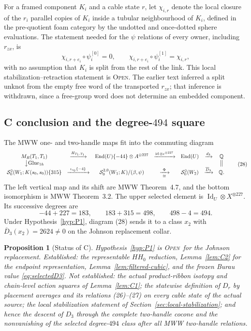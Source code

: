 \documentclass[11pt]{amsart}
\newtheorem{proposition}[theorem]{Proposition}
\theoremstyle{definition}
\theoremstyle{remark}
\newcommand{\Q}{\mathbb{Q}}
\newcommand{\Open}{\textnormal{\textsc{Open}}}
\begin{document}
For a framed component $K_i$ and a cable state $r$, let $\chi_{i,r}$ denote
the local closure of the $r_i$ parallel copies of $K_i$ inside a tubular
neighbourhood of $K_i$, defined in the pre-quotient foam category by the
undotted and once-dotted sphere evaluations.  The statement needed for the
$\psi$ relations of every owner, including $r_{zx}$, is
\[
\chi_{i,r+e_i}\circ\psi_i^{[0]}=0,\qquad
\chi_{i,r+e_i}\circ\psi_i^{[1]}=\chi_{i,r},
\]
with no assumption that $K_i$ is split from the rest of the link.  This
local stabilization--retraction statement is \Open.  The earlier text
inferred a split unknot from the empty free word of the transported
$r_{zx}$; that inference is withdrawn, since a free-group word does not
determine an embedded component.

\subsection{C conclusion and the degree-$494$ square}

The MWW one- and two-handle maps fit into the commuting diagram
\[
\begin{array}{ccccccc}
M_R(T_1,T_1)&\xrightarrow{H_{T_1,T_1}}&
\operatorname{End}(U)\{-44\}\otimes A^{\otimes227}
&\xrightarrow{\operatorname{id}\otimes\epsilon^{\otimes227}}&
\operatorname{End}(U)&\xrightarrow{d_3}&\Q\\
\big\downarrow{\mathrm{Glue}_{1h}}&&&&&&\big\Vert\\
\mathcal S^2_0(W_1;K(s_0,s_0))\{315\}
&\xrightarrow{\ \iota_{s_0}\{-4\}\ }&
\mathcal S^{2,0}_0(W_1;K)/(\beta,\psi)
&\xrightarrow[\cong]{\ \Phi\ }&\mathcal S^2_0(W_2)
&\xrightarrow{\overline D_3}&\Q.
\end{array}
\tag{28}
\]
The left vertical map and its shift are MWW Theorem~4.7, and the bottom
isomorphism is MWW Theorem~3.2.  The upper selected element is
$\operatorname{Id}_U\otimes X^{\otimes227}$.  Its successive degrees are
\[
-44+227=183,\qquad183+315=498,\qquad498-4=494.
\]
Under Hypothesis~\ref{hyp:P1}, diagram (28) sends it to a class $x_2$
with $\overline D_3(x_2)=2624\ne0$ on the Johnson replacement collar.

\begin{proposition}[Status of C]\label{thm:Cdischarge}
Hypothesis~\ref{hyp:P1} is \Open\ for the Johnson replacement.
Established: the representable $HH_0$ reduction, Lemma~\ref{lem:C2} for the
endpoint representation, Lemma~\ref{lem:filtered-cubic}, and the frozen
Burau value \eqref{eq:selectedD3}.  Not established: the actual
product-ribbon isotopy and chain-level action squares of
Lemma~\ref{lem:C1}; the statewise definition of $D_r$ by placement averages
and its relations (26)--(27) on every cable state of the actual source; the
local stabilization statement of Section~\ref{sec:local-stabilization}; and
hence the descent of $D_3$ through the complete two-handle cocone and the
nonvanishing of the selected degree-$494$ class after all MWW two-handle
relations.
\end{proposition}
\end{document}
